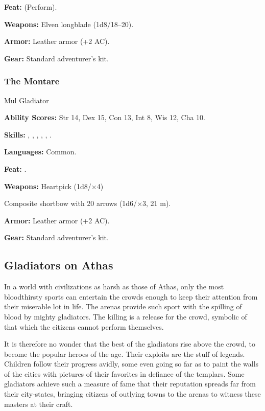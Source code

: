 \textbf{Feat:}  (Perform).

\textbf{Weapons:} Elven longblade (1d8/18--20).

\textbf{Armor:} Leather armor (+2 AC).

\textbf{Gear:} Standard adventurer's kit.

\subsubsection{The Montare}
Mul Gladiator

\textbf{Ability Scores:} Str 14, Dex 15, Con 13, Int 8, Wis 12, Cha 10.

\textbf{Skills:} , , , , , .

\textbf{Languages:} Common.

\textbf{Feat:} .

\textbf{Weapons:} Heartpick (1d8/$\times$4)

Composite shortbow with 20 arrows (1d6/$\times$3, 21 m).

\textbf{Armor:} Leather armor (+2 AC).

\textbf{Gear:} Standard adventurer's kit.

\subsection{Gladiators on Athas}

In a world with civilizations as harsh as those of Athas, only the most bloodthirsty sports can entertain the crowds enough to keep their attention from their miserable lot in life. The arenas provide such sport with the spilling of blood by mighty gladiators. The killing is a release for the crowd, symbolic of that which the citizens cannot perform themselves.

It is therefore no wonder that the best of the gladiators rise above the crowd, to become the popular heroes of the age. Their exploits are the stuff of legends. Children follow their progress avidly, some even going so far as to paint the walls of the cities with pictures of their favorites in defiance of the templars. Some gladiators achieve such a measure of fame that their reputation spreads far from their city-states, bringing citizens of outlying towns to the arenas to witness these masters at their craft.

